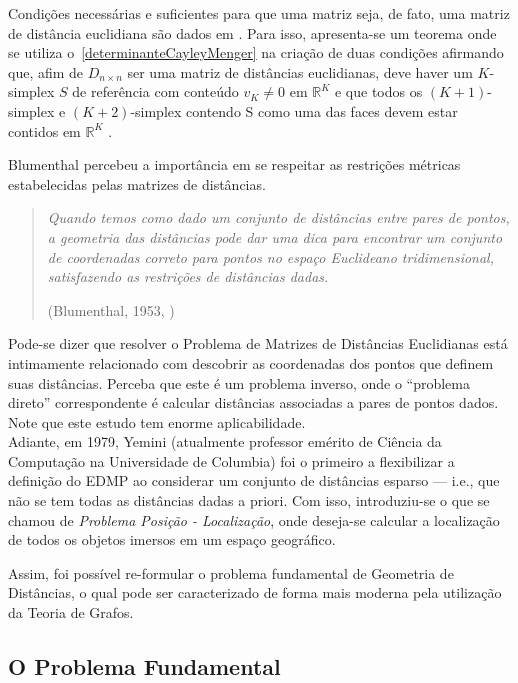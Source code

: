 Condições necessárias e suficientes para que uma matriz seja, de fato, uma matriz de distância euclidiana são dados em \cite{EDMPResolucao}. Para isso, apresenta-se um teorema onde se utiliza o~\ref{determinanteCayleyMenger} na criação de duas condições afirmando que, afim de $D_{n\times n}$ ser uma matriz de distâncias euclidianas, deve haver um $K$-simplex $S$ de referência com conteúdo $v_K \neq 0$ em $\mathbb{R}^K$ e que todos os $(K+1)$-simplex e $(K+2)$-simplex contendo S como uma das faces devem estar contidos em $\mathbb{R}^K$ \cite{carlileGDandAplications}.

Blumenthal percebeu a importância em se respeitar as restrições métricas estabelecidas pelas matrizes de distâncias.
\begin{quotation}
	\textit{Quando temos como dado um conjunto de distâncias entre pares de pontos, a geometria das distâncias pode dar uma dica para encontrar um conjunto de coordenadas correto para pontos no espaço Euclideano tridimensional, satisfazendo as restrições de distâncias dadas.}
	\begin{flushright}
		(Blumenthal, 1953, \cite{Blumenthal:53})
	\end{flushright}
\end{quotation}

Pode-se dizer que resolver o Problema de Matrizes de Distâncias Euclidianas está intimamente relacionado com descobrir as coordenadas dos pontos que definem suas distâncias. Perceba que este é um problema inverso, onde o ``problema direto'' correspondente é calcular distâncias associadas a pares de pontos dados. Note que este estudo tem enorme aplicabilidade.
\\

Adiante, em 1979, Yemini (atualmente professor emérito de Ciência da Computação na Universidade de Columbia) foi o primeiro a flexibilizar a definição do EDMP ao considerar um conjunto de distâncias esparso \cite{Yemini:79} --- i.e., que não se tem todas as distâncias dadas a priori. Com isso, introduziu-se o que se chamou de \textit{Problema Posição - Localização}, onde deseja-se calcular a localização de todos os objetos imersos em um espaço geográfico. 

Assim, foi possível re-formular o problema fundamental de Geometria de Distâncias, o qual pode ser caracterizado de forma mais moderna pela utilização da Teoria de Grafos.

\subsection{O Problema Fundamental}

